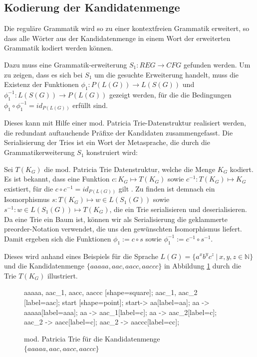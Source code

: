\documentclass[a4paper,12pt]{report}
\begin{document}
\subsection{Kodierung der Kandidatenmenge}
\label{codekand}
Die reguläre Grammatik wird so zu einer kontextfreien Grammatik erweitert, so dass alle Wörter aus der Kandidatenmenge in einem Wort der erweiterten Grammatik kodiert werden können. 

Dazu muss eine Grammatik-erweiterung $S_1: REG\rightarrow CFG$ gefunden werden.
Um zu zeigen, dass es sich bei $S_1$ um die gesuchte Erweiterung handelt, muss die Existenz der Funktionen $\phi_1: P(L(G)) \rightarrow L(S(G))$ und $\phi_1^{-1}: L(S(G)) \rightarrow P(L(G))$ gezeigt werden, für die die Bedingungen $\phi_1\circ\phi_1^{-1} = id_{P(L(G))}$ erfüllt sind.

Dieses kann mit Hilfe einer mod. Patricia Trie-Datenstruktur realisiert werden, die redundant auftauchende Präfixe der Kandidaten zusammengefasst. Die Serialisierung der Tries ist ein Wort der Metasprache, die durch die Grammatikerweiterung $S_1$ konstruiert wird:

Sei $T(K_G)$ die mod. Patricia Trie Datenstruktur, welche die Menge $K_G$ kodiert. Es ist bekannt, dass eine Funktion $c: K_G \mapsto T(K_G)$ sowie $c^{-1}: T(K_G) \mapsto K_G$ existiert, für die $c\circ c^{-1} = id_{P(L(G))}$ gilt \cite{Morrison1968}. Zu finden ist demnach ein Isomorphismus $s: T(K_G) \mapsto w \in L(S_1(G))$ sowie $s^{-1}: w \in L(S_1(G)) \mapsto T(K_G)$, die ein Trie serialisieren und deserialisieren. Da eine Trie ein Baum ist, können wir als Serialisierung die geklammerte preorder-Notation verwendet, die uns den gewünschten Isomorphismus liefert. Damit ergeben sich die Funktionen $\phi_1 := c \circ s$ sowie $\phi_1^{-1} := c^{-1} \circ s^{-1}$. 

Dieses wird anhand eines Beispiels für die Sprache $L(G) = \{ a^xb^yc^z\ |\ x,y,z\in \mathbb{N} \}$ und die Kandidatenmenge $\{aaaaa, aac, aacc, aaccc \}$ in Abbildung \ref{trieexk} durch die Trie $T(K_G)$ illustriert.

\begin{figure}[ht]
    \centering
    {
      aaaaa, aac_1, aacc, aaccc [shape=square];
      aac_1, aac_2 [label=aac];
      start [shape=point];
      start-> aa[label=aa];
      aa -> aaaaa[label=aaa];
      aa -> aac_1[label=c];
      aa -> aac_2[label=c];
      aac_2 -> aacc[label=c];
      aac_2 -> aaccc[label=cc];
    }
    \caption{mod. Patricia Trie für die Kandidatenmenge $\{aaaaa, aac, aacc, aaccc \}$}
    \label{trieexk}
\end{figure}
\end{document}
